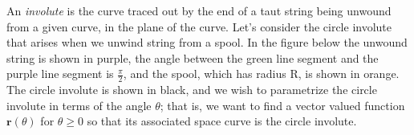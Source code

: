\documentclass[12pt]{exam}
\begin{document}
\begin{questions}
\clearpage
\question An \textit{involute} is the curve traced out by the end of a taut string being unwound from a given curve, in the plane of the curve. Let's consider the circle involute that arises when we unwind string from a spool. In the figure below the unwound string is shown in purple, the angle between the green line segment and the purple line segment is $\frac{\pi}{2}$, and the spool, which has radius R, is shown in orange. The circle involute is shown in black, and we wish to parametrize the circle involute in terms of the angle $\theta$; that is, we want to find a vector valued function $\mathbf{r}(\theta)$ for $\theta \geq 0$ so that its associated space curve is the circle involute.\\
\begin{center}

\end{center}
\end{questions}
\end{document}
